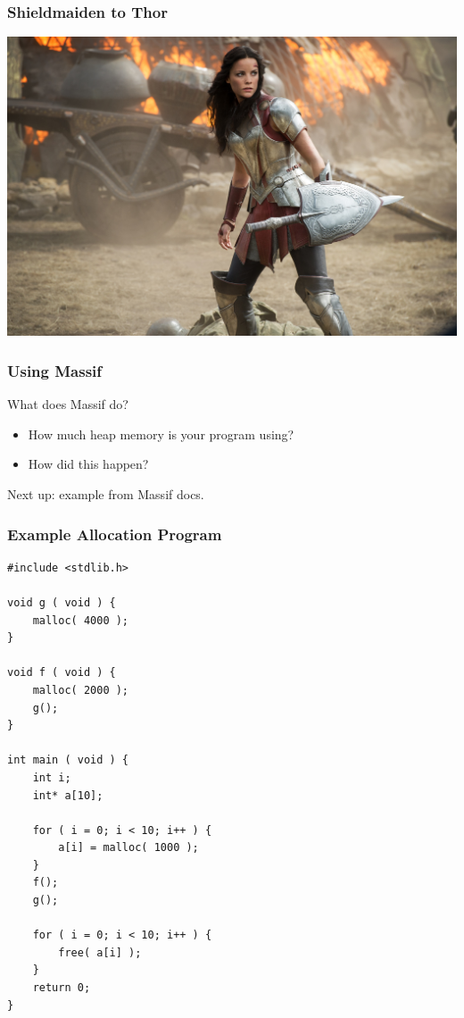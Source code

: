 \begin{frame}
\frametitle{Shieldmaiden to Thor}

\begin{center}
	\includegraphics[width=\textwidth]{images/Sif.jpg}
\end{center}

\end{frame}



\begin{frame}
\frametitle{Using Massif}

\Large
\begin{changemargin}{2cm}
What does Massif do? 

\begin{itemize}
\item How much heap memory is your program using?
\item How did this happen?
\end{itemize}

Next up: example from Massif docs.

\end{changemargin}

\end{frame}

\begin{frame}[fragile]
\frametitle{Example Allocation Program}

{\scriptsize
\begin{verbatim}
#include <stdlib.h>

void g ( void ) {
    malloc( 4000 );
}

void f ( void ) {
    malloc( 2000 );
    g();
}

int main ( void ) {
    int i;
    int* a[10];

    for ( i = 0; i < 10; i++ ) {
        a[i] = malloc( 1000 );
    }
    f();
    g();

    for ( i = 0; i < 10; i++ ) {
        free( a[i] );
    }
    return 0;
}
\end{verbatim}
}


\end{frame}

